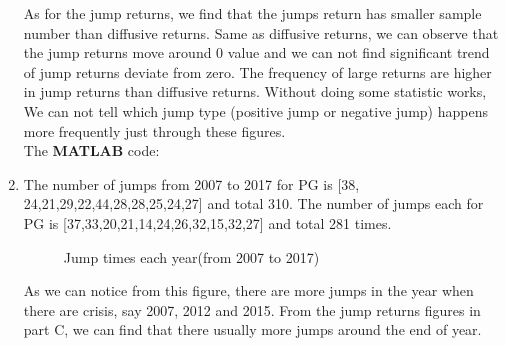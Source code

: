 \documentclass[12pt,letterpaper]{article}
\begin{document}
\begin{enumerate}[label=\textbf{(\Alph*)}]
As for the jump returns, we find that the jumps return has smaller sample number than diffusive returns. Same as diffusive returns, we can observe that the jump returns move around 0 value and we can not find significant trend of jump returns deviate from zero. The frequency of large returns are higher in jump returns than diffusive returns. Without doing some statistic works, We can not tell which jump type (positive jump or negative jump) happens more frequently just through these figures.\\


The \textbf{MATLAB} code:
   
   
   

\item The number of jumps from 2007 to 2017 for PG is [38, 24,21,29,22,44,28,28,25,24,27] and total 310. 
The number of jumps each for PG is [37,33,20,21,14,24,26,32,15,32,27] and total 281 times.\\
\begin{figure}[H]
            \centering
            \caption{Jump times each year(from 2007 to 2017)}
\end{figure}
      As we can notice from this figure, there are more jumps in the year when  there are crisis, say 2007, 2012 and 2015. From the jump returns figures in part C, we can find that there usually more jumps around the end of year.\\
      

\end{enumerate}
\end{document}
